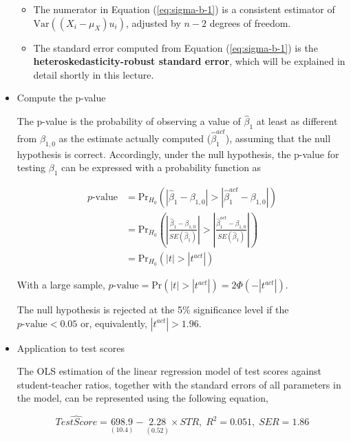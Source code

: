 \documentclass[a4paper,11pt]{article}
\newcommand{\var}{\mathrm{Var}}
\newcommand{\pr}{\mathrm{Pr}}
\begin{document}
\begin{itemize}
\begin{itemize}
\item The numerator in Equation (\ref{eq:sigma-b-1}) is a consistent
estimator of \(\var((X_i - \mu_X)u_i)\), adjusted by \(n-2\) degrees
of freedom.

\item The standard error computed from Equation (\ref{eq:sigma-b-1}) is
the \textbf{heteroskedasticity-robust standard error}, which will be
explained in detail shortly in this lecture.
\end{itemize}

\item Compute the p-value
\label{sec:orge0434eb}

The p-value is the probability of observing a value of \(\hat{\beta}_1\)
at least as different from \(\beta_{1,0}\) as the estimate actually
computed (\(\hat{\beta}^{act}_1\)), assuming that the null hypothesis is
correct. Accordingly, under the null hypothesis, the p-value for
testing \(\beta_1\) can be expressed with a probability function as

\begin{equation*}
\begin{split}
p\text{-value} &= \pr_{H_0} \left( | \hat{\beta}_1 - \beta_{1,0} | > | \hat{\beta}^{act}_1 - \beta_{1,0} | \right) \\
&= \pr_{H_0} \left( \left| \frac{\hat{\beta}_1 - \beta_{1,0}}{SE(\hat{\beta}_1)} \right| > \left| \frac{\hat{\beta}^{act}_1 - \beta_{1,0}}{SE(\hat{\beta}_1)} \right| \right) \\
&= \pr_{H_0} \left( |t| > |t^{act}| \right)
\end{split}
\end{equation*}

With a large sample, \(p\text{-value} = \pr\left(|t| > |t^{act}|
\right) = 2 \varPhi(-|t^{act}|)\).

The null hypothesis is rejected at the 5\% significance level if the
\(p\text{-value} < 0.05\) or, equivalently, \(|t^{act}| > 1.96\). 

\item Application to test scores
\label{sec:orge8c1c82}

The OLS estimation of the linear regression model of test scores
against student-teacher ratios, together with the standard errors of
all parameters in the model, can be represented using the following
equation, 

\begin{equation*}
\widehat{TestScore} = \underset{\displaystyle (10.4)}{698.9} - \underset{\displaystyle (0.52)}{2.28} \times STR,\; R^2 = 0.051,\; SER = 1.86
\end{equation*}


\end{itemize}
\end{document}
